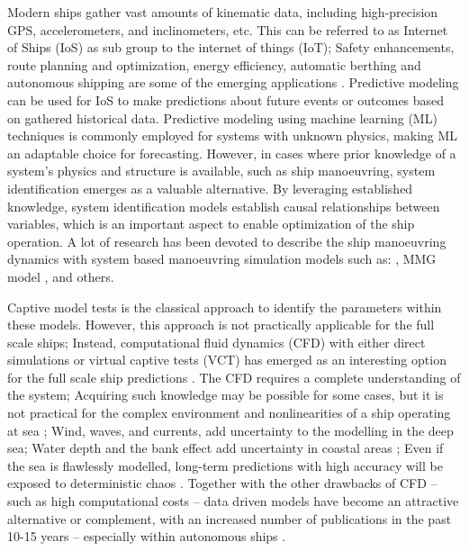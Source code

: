 Modern ships gather vast amounts of kinematic data, including high-precision GPS, accelerometers, and inclinometers, etc. This can be referred to as Internet of Ships (IoS) \citep{liu_internet_2016} as sub group to the internet of things (IoT); Safety enhancements, route planning and optimization, energy efficiency, automatic berthing and autonomous shipping are some of the emerging applications \citep{aslam_internet_2020}.
Predictive modeling can be used for IoS to make predictions about future events or outcomes based on gathered historical data.
Predictive modeling using machine learning (ML) techniques is commonly employed for systems with unknown physics, making ML an adaptable choice for forecasting. However, in cases where prior knowledge of a system's physics and structure is available, such as ship manoeuvring, system identification emerges as a valuable alternative. By leveraging established knowledge, system identification models establish causal relationships between variables, which is an important aspect to enable optimization of the ship operation.
A lot of research has been devoted to describe the ship manoeuvring dynamics with system based manoeuvring simulation models such as: \citet{abkowitz_ship_1964,nomoto_steering_1957,norrbin_theory_1971}, MMG model \citep{yasukawa_introduction_2015}, and others.

Captive model tests is the classical approach to identify the parameters within these models. However, this approach is not practically applicable for the full scale ships; Instead, computational fluid dynamics (CFD) with either direct simulations or virtual captive tests (VCT) has emerged as an interesting option for the full scale ship predictions \citep{liu_predictions_2018,li_ship_2022}.
The CFD requires a complete understanding of the system; Acquiring such knowledge may be possible for some cases, but it is not practical for the complex environment and nonlinearities of a ship operating at sea \citep{miller_ship_2021};
Wind, waves, and currents, add uncertainty to the modelling in the deep sea; Water depth and the bank effect add uncertainty in coastal areas \citep{nielsen_machine_2022};
Even if the sea is flawlessly modelled, long-term predictions with high accuracy will be exposed to deterministic chaos \citep{lorenz_deterministic_1963}.
Together with the other drawbacks of CFD -- such as high computational costs -- data driven models have become an attractive alternative or complement, with an increased number of publications in the past 10-15 years -- especially within autonomous ships \citep{ahmed_survey_2023}.

